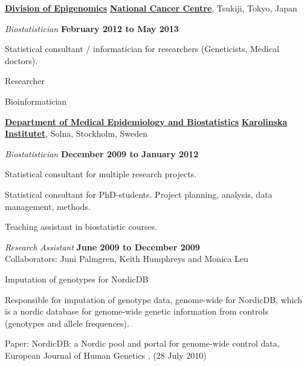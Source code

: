 \halfblankline

\href{http://www.ncc.go.jp/en/nccri/divisions/14carc/14carc.html}{\textbf{Division of Epigenomics}}
\href{http://www.ncc.go.jp/}{\textbf{National Cancer Centre}}, Tsukiji, Tokyo, Japan
\begin{outerlist}
\item[] \textit{Biostatistician}%
  \hfill \textbf{February 2012 to May 2013}
  \begin{innerlist}
  \item Statistical consultant / informatician for researchers (Geneticists, Medical doctors).
  \item Researcher
  \item Bioinformatician
  \end{innerlist}
\end{outerlist}

\halfblankline

\href{http://ki.se/ki/jsp/polopoly.jsp?d=9600}{\textbf{Department of Medical Epidemiology and Biostatistics}}
\href{http://www.ki.se/}{\textbf{Karolinska Institutet}}, Solna, Stockholm, Sweden
\begin{outerlist}
\item[] \textit{Biostatistician}%
  \hfill \textbf{December 2009 to January 2012}
  \begin{innerlist}
  \item Statistical consultant for multiple research projects.
  \item Statistical consultant for PhD-students. Project planning, analysis, data management, methods.
  \item Teaching assistant in biostatistic courses.
  \end{innerlist}

\item[] \textit{Research Assistant}%
  \hfill \textbf{June 2009 to December 2009}
  \\ Collaborators: Juni Palmgren, Keith Humphreys and Monica Leu
  \begin{innerlist}
  \item Imputation of genotypes for NordicDB
    \begin{innerlist}
    \item Responsible for imputation of genotype data, genome-wide for NordicDB, which is a nordic database for genome-wide genetic information from controls (genotypes and allele frequences).
    \item Paper: NordicDB: a Nordic pool and portal for genome-wide control data, European Journal of Human Genetics , (28 July 2010)
    \end{innerlist}
  \end{innerlist}

\end{outerlist}

